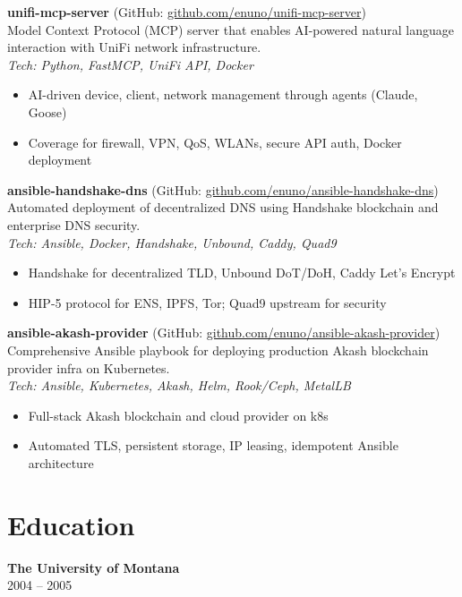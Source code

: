 \documentclass[11pt,a4paper]{article}
\begin{document}
\textbf{unifi-mcp-server} (GitHub: \href{https://github.com/enuno/unifi-mcp-server}{github.com/enuno/unifi-mcp-server})\\
Model Context Protocol (MCP) server that enables AI-powered natural language interaction with UniFi network infrastructure.\\
\emph{Tech: Python, FastMCP, UniFi API, Docker}

\vspace{-0.5em}
\begin{itemize}[leftmargin=1.2em]
    \item AI-driven device, client, network management through agents (Claude, Goose)
    \item Coverage for firewall, VPN, QoS, WLANs, secure API auth, Docker deployment
\end{itemize}

\textbf{ansible-handshake-dns} (GitHub: \href{https://github.com/enuno/ansible-handshake-dns}{github.com/enuno/ansible-handshake-dns})\\
Automated deployment of decentralized DNS using Handshake blockchain and enterprise DNS security.\\
\emph{Tech: Ansible, Docker, Handshake, Unbound, Caddy, Quad9}
\vspace{-0.5em}
\begin{itemize}[leftmargin=1.2em]
    \item Handshake for decentralized TLD, Unbound DoT/DoH, Caddy Let's Encrypt
    \item HIP-5 protocol for ENS, IPFS, Tor; Quad9 upstream for security
\end{itemize}

\textbf{ansible-akash-provider} (GitHub: \href{https://github.com/enuno/ansible-akash-provider}{github.com/enuno/ansible-akash-provider})\\
Comprehensive Ansible playbook for deploying production Akash blockchain provider infra on Kubernetes.\\
\emph{Tech: Ansible, Kubernetes, Akash, Helm, Rook/Ceph, MetalLB}
\vspace{-0.5em}
\begin{itemize}[leftmargin=1.2em]
    \item Full-stack Akash blockchain and cloud provider on k8s
    \item Automated TLS, persistent storage, IP leasing, idempotent Ansible architecture
\end{itemize}

\section*{Education}
\textbf{The University of Montana}\\
2004 -- 2005
\end{document}

